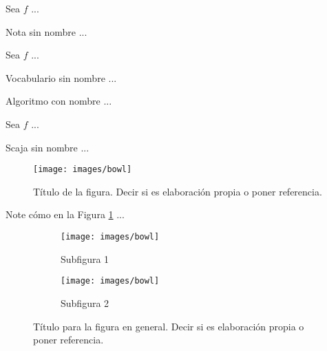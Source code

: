 \documentclass[fleqn]{Paquetes/RevDigMatEduInt}
\begin{document}
\begin{nota}
Sea $f$ ...
\end{nota}

\begin{nota}
Nota sin nombre ...
\end{nota}

\begin{vocabulario}
Sea $f$ ...
\end{vocabulario}

\begin{vocabulario}
Vocabulario sin nombre ...
\end{vocabulario}

\begin{algoritmo}
	Algoritmo con nombre ...
\end{algoritmo}


\begin{caja}
Sea $f$ ...
\end{caja}

\begin{scaja}
Scaja sin nombre ...
\end{scaja}


\begin{figure}[ht!!!]
	\centering
	\begin{minipage}{0.7\textwidth}
		\centering
		\texttt{[image: images/bowl]}
		\caption{Título de la figura. Decir si es elaboración propia o poner referencia.}
		\label{fig:nombre}
	\end{minipage}
\end{figure}

Note cómo en la Figura \ref{fig:nombre} ...

\begin{figure}[ht!!!]
	\centering
	\begin{minipage}{0.7\textwidth}
		\centering
		\begin{subfigure}{0.47\textwidth}
			\centering
			\texttt{[image: images/bowl]}
			\caption{Subfigura 1}
			\label{subfig:1}
		\end{subfigure}
		\begin{subfigure}{0.47\textwidth}
			\centering
			\texttt{[image: images/bowl]}
			\caption{Subfigura 2}
			\label{subfig:2}
		\end{subfigure}
		\caption{ Título para la figura en general. Decir si es elaboración propia o poner referencia.}
		\label{fig:2}
	\end{minipage}
\end{figure}
\end{document}
